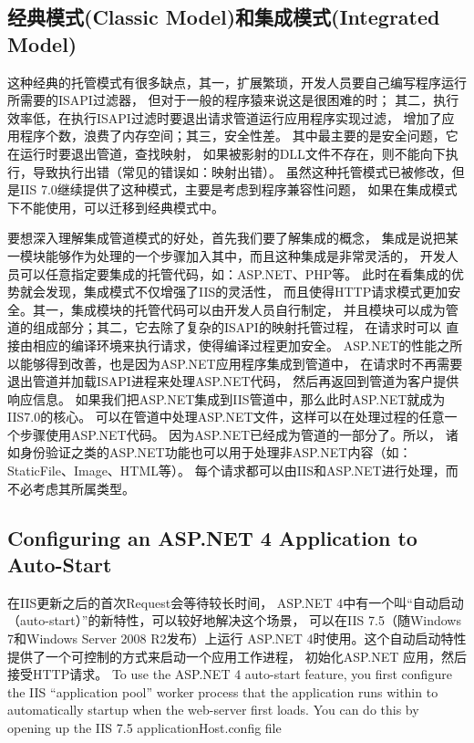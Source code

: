 \documentclass{book}
\begin{document}
\subsection{经典模式(Classic Model)和集成模式(Integrated Model)}

这种经典的托管模式有很多缺点，其一，扩展繁琐，开发人员要自己编写程序运行所需要的ISAPI过滤器，
但对于一般的程序猿来说这是很困难的时；
其二，执行效率低，在执行ISAPI过滤时要退出请求管道运行应用程序实现过滤，
增加了应用程序个数，浪费了内存空间；其三，安全性差。
其中最主要的是安全问题，它在运行时要退出管道，查找映射，
如果被影射的DLL文件不存在，则不能向下执行，导致执行出错（常见的错误如：映射出错）。
虽然这种托管模式已被修改，但是IIS 7.0继续提供了这种模式，主要是考虑到程序兼容性问题，
如果在集成模式下不能使用，可以迁移到经典模式中。

要想深入理解集成管道模式的好处，首先我们要了解集成的概念，
集成是说把某一模块能够作为处理的一个步骤加入其中，而且这种集成是非常灵活的，
开发人员可以任意指定要集成的托管代码，如：ASP.NET、PHP等。
此时在看集成的优势就会发现，集成模式不仅增强了IIS的灵活性，
而且使得HTTP请求模式更加安全。其一，集成模块的托管代码可以由开发人员自行制定，
并且模块可以成为管道的组成部分；其二，它去除了复杂的ISAPI的映射托管过程，
在请求时可以 直接由相应的编译环境来执行请求，使得编译过程更加安全。
ASP.NET的性能之所以能够得到改善，也是因为ASP.NET应用程序集成到管道中，
在请求时不再需要退出管道并加载ISAPI进程来处理ASP.NET代码，
然后再返回到管道为客户提供响应信息。        
如果我们把ASP.NET集成到IIS管道中，那么此时ASP.NET就成为IIS7.0的核心。
可以在管道中处理ASP.NET文件，这样可以在处理过程的任意一个步骤使用ASP.NET代码。
因为ASP.NET已经成为管道的一部分了。所以，
诸如身份验证之类的ASP.NET功能也可以用于处理非ASP.NET内容（如：StaticFile、Image、HTML等）。
每个请求都可以由IIS和ASP.NET进行处理，而不必考虑其所属类型。

\subsection{Configuring an ASP.NET 4 Application to Auto-Start}

在IIS更新之后的首次Request会等待较长时间，
ASP.NET 4中有一个叫“自动启动（auto-start）”的新特性，可以较好地解决这个场景， 
可以在IIS 7.5（随Windows 7和Windows Server 2008 R2发布）上运行 ASP.NET 4时使用。这个自动启动特性提供了一个可控制的方式来启动一个应用工作进程，
初始化ASP.NET 应用，然后接受HTTP请求。
To use the ASP.NET 4 auto-start feature, 
you first configure the IIS “application pool” worker 
process that the application runs within to automatically startup when the web-server first loads.  You can do this by opening up the IIS 7.5 applicationHost.config file
\end{document}

